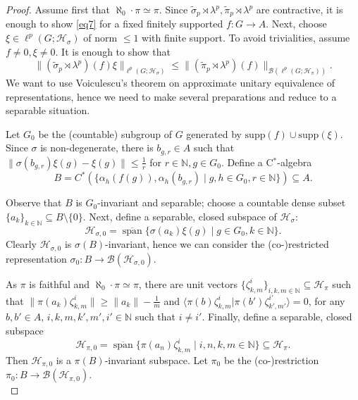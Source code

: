 \documentclass[12pt]{amsart}
\theoremstyle{definition}
\theoremstyle{remark}
\numberwithin{equation}{section}
\newcommand{\N}{\mathbb{N}}
\newcommand{\supp}{\text{supp}}
\newcommand{\la}{\langle}
\newcommand{\ra}{\rangle}
\newcommand{\mc}{\mathcal}
\newcommand{\wt}{\widetilde}
\newcommand{\ov}{\overline}
\newcommand{\lin}{\operatorname{span}}
\begin{document}
\begin{proof}
Assume first that $\aleph_0\cdot \pi\simeq \pi$. Since $\wt{\sigma}_p\rtimes \lambda^p, \wt{\pi}_p\rtimes \lambda^p$ are contractive, it is enough to show \eqref{eq7} for a fixed finitely supported $f\colon G\rightarrow A$. Next, choose $\xi\in \ell^p(G;\mc{H}_\sigma)$ of norm $\le 1$ with finite support. To avoid trivialities, assume $f\neq 0, \xi\neq 0$. It is enough to show that
\begin{equation}\label{eq6}
\| (\wt{\sigma}_p\rtimes \lambda^p)(f) \xi\|_{\ell^p(G;\mc{H}_\sigma)}\le
\|(\wt{\pi}_p\rtimes\lambda^p)(f)\|_{\mc{B}(\ell^p(G;\mc{H}_\pi))}.
\end{equation}
We want to use Voiculescu's theorem on approximate unitary equivalence of representations, hence we need to make several preparations and reduce to a separable situation.

Let $G_0$ be the (countable) subgroup of $G$ generated by $\supp(f)\cup\supp(\xi)$. Since $\sigma$ is non-degenerate, there is $b_{g,r}\in A$ such that $\|\sigma(b_{g,r})\xi(g) - \xi(g)\|\le \tfrac{1}{r}$ for $r\in\N, g\in G_0$. Define a C$^*$-algebra 
\[ 
B=C^*(\{\alpha_{h}(f(g)),\alpha_{h}(b_{g,r})\mid g,h \in G_0,r\in\N\})\subseteq A.
\]

Observe that $B$ is $G_0$-invariant and separable; choose a countable dense subset $\{a_k\}_{k\in\N}\!\subseteq B\setminus\{0\}$. Next, define a separable, closed subspace of $\mc{H}_\sigma$:
\[\mc{H}_{\sigma,0}=\ov{\lin}\{  \sigma(a_k)\xi(g)\mid g\in G_0, k\in\N\}.\]
Clearly $\mc{H}_{\sigma,0}$ is $\sigma(B)$-invariant, hence we can consider the (co-)restricted representation $\sigma_0\colon B\rightarrow \mc{B}(\mc{H}_{\sigma,0})$.

 As $\pi$ is faithful and $\aleph_0\cdot \pi\simeq \pi$, there are unit vectors $\{\zeta_{k,m}^i\}_{i,k,m\in\N}\subseteq \mc{H}_\pi$ such that $\|\pi(a_k)\zeta^i_{k,m}\| \ge \|a_k\|-\tfrac{1}{m}$ and $\la \pi(b)\zeta^i_{k,m} | \pi(b')\zeta^{i'}_{k',m'}\ra=0$, for any $b,b'\in A,\, i,k,m,k',m',i'\in \N$ such that $i\neq i'$. Finally, define a separable, closed subspace
\[\mc{H}_{\pi,0}=\ov{\lin} \{\pi(a_n)\zeta_{k,m}^i\mid i,n,k,m\in \N\}\subseteq \mc{H}_{\pi}.
\]
Then $\mc{H}_{\pi,0}$ is a $\pi(B)$-invariant subspace. Let $\pi_0$ be the (co-)restriction $\pi_0\colon B\rightarrow \mc{B}(\mc{H}_{\pi,0})$.\\


\end{proof}
\end{document}
